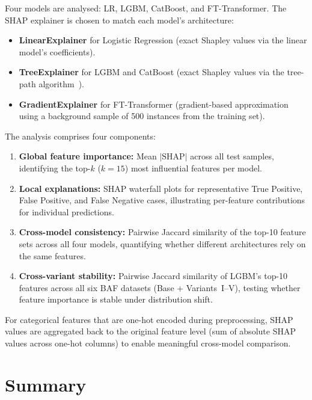 Four models are analysed: LR, LGBM, CatBoost, and FT-Transformer. The SHAP explainer is chosen to match each model's architecture:
\begin{itemize}
  \item \textbf{LinearExplainer} for Logistic Regression (exact Shapley values via the linear model's coefficients).
  \item \textbf{TreeExplainer} for LGBM and CatBoost (exact Shapley values via the tree-path algorithm~\cite{lundberg2020local}).
  \item \textbf{GradientExplainer} for FT-Transformer (gradient-based approximation using a background sample of 500 instances from the training set).
\end{itemize}

The analysis comprises four components:
\begin{enumerate}
  \item \textbf{Global feature importance:} Mean $|\text{SHAP}|$ across all test samples, identifying the top-$k$ ($k=15$) most influential features per model.
  \item \textbf{Local explanations:} SHAP waterfall plots for representative True Positive, False Positive, and False Negative cases, illustrating per-feature contributions for individual predictions.
  \item \textbf{Cross-model consistency:} Pairwise Jaccard similarity of the top-10 feature sets across all four models, quantifying whether different architectures rely on the same features.
  \item \textbf{Cross-variant stability:} Pairwise Jaccard similarity of LGBM's top-10 features across all six BAF datasets (Base + Variants~I--V), testing whether feature importance is stable under distribution shift.
\end{enumerate}

For categorical features that are one-hot encoded during preprocessing, SHAP values are aggregated back to the original feature level (sum of absolute SHAP values across one-hot columns) to enable meaningful cross-model comparison.

\section{Summary}
\label{sec:methodology_summary}

